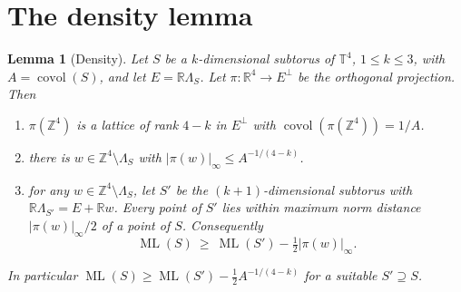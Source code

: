 \documentclass[12pt]{amsart}
\newtheorem{lemma}[theorem]{Lemma}
\theoremstyle{definition}\newtheorem{definition}[theorem]{Definition}
\theoremstyle{remark}\newtheorem{remark}[theorem]{Remark}
\newcommand{\Z}{\mathbb Z}\newcommand{\R}{\mathbb R}\newcommand{\T}{\mathbb T}
\newcommand{\ML}{\operatorname{ML}}
\newcommand{\covol}{\operatorname{covol}}
\newcommand{\supn}[1]{\lvert #1\rvert_\infty}
\begin{document}
\section{The density lemma}
\begin{lemma}[Density]\label{lem:density}
Let $S$ be a $k$-dimensional subtorus of $\T^4$, $1\le k\le 3$, with $A=\covol(S)$, and let $E=\R\Lambda_S$. Let $\pi:\R^4\to E^\perp$ be the orthogonal projection. Then
\begin{enumerate}[label=\textup{(\alph*)},leftmargin=*]
\item $\pi(\Z^4)$ is a lattice of rank $4-k$ in $E^\perp$ with $\covol(\pi(\Z^4))=1/A$.
\item there is $w\in\Z^4\setminus\Lambda_S$ with $\supn{\pi(w)}\le A^{-1/(4-k)}$.
\item for any $w\in\Z^4\setminus\Lambda_S$, let $S'$ be the $(k+1)$-dimensional subtorus with $\R\Lambda_{S'}=E+\R w$. Every point of $S'$ lies within maximum norm distance $\supn{\pi(w)}/2$ of a point of $S$. Consequently
\[
 \ML(S)\ \ge\ \ML(S')-\tfrac12\supn{\pi(w)}.
\]
\end{enumerate}
In particular $\ML(S)\ge \ML(S')-\frac12A^{-1/(4-k)}$ for a suitable $S'\supseteq S$.
\end{lemma}
\end{document}
